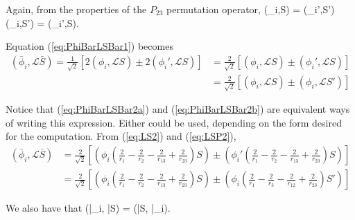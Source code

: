 \documentclass[Dissertation.tex]{subfiles}
\begin{document}
Again, from the properties of the $P_{23}$ permutation operator,
\beq
(\phi_i,S) = (\phi_i',S')  (\phi_i,S') = (\phi_i',S).
\eeq

Equation (\ref{eq:PhiBarLSBar1}) becomes
\begin{subequations}
\label{eq:PhiBarLSBar2}
\begin{align}
(\bar{\phi}_i, \mathcal{L}\bar{S}) = \frac{1}{\sqrt{2}} \left[2(\phi_i,\mathcal{L}S) \pm 2(\phi_i',\mathcal{L}S)\right] &= \frac{2}{\sqrt{2}} \left[(\phi_i,\mathcal{L}S) \pm (\phi_i',\mathcal{L}S)\right] \label{eq:PhiBarLSBar2a} \\
 &= \frac{2}{\sqrt{2}} \left[(\phi_i,\mathcal{L}S) \pm (\phi_i,\mathcal{L}S')\right]  \label{eq:PhiBarLSBar2b}
\end{align}
\end{subequations}

Notice that (\ref{eq:PhiBarLSBar2a}) and (\ref{eq:PhiBarLSBar2b}) are equivalent ways of writing this expression.  Either could be used, depending on the form desired for the computation.
From (\ref{eq:LS2}) and (\ref{eq:LSP2}),
\begin{align}
(\bar{\phi}_i, \mathcal{L}\bar{S}) &= \frac{2}{\sqrt{2}} \left[\left( \phi_i \left( \frac{2}{r_1} - \frac{2}{r_2} - \frac{2}{r_{13}} + \frac{2}{r_{23}} \right) S\right) \pm \left( \phi_i' \left( \frac{2}{r_1} - \frac{2}{r_2} - \frac{2}{r_{13}} + \frac{2}{r_{23}} \right) S\right)\right] \\
 &= \frac{2}{\sqrt{2}} \left[\left( \phi_i \left( \frac{2}{r_1} - \frac{2}{r_2} - \frac{2}{r_{13}} + \frac{2}{r_{23}} \right) S\right) \pm \left( \phi_i \left( \frac{2}{r_1} - \frac{2}{r_3} - \frac{2}{r_{12}} + \frac{2}{r_{23}} \right) S'\right)\right]
\end{align}

\noindent We also have that
\beq
(\bar{\phi}_i, \bar{S}) = (\bar{S}, \bar{\phi}_i).
\label{eq:PhiLSPerm}
\eeq
\end{document}
